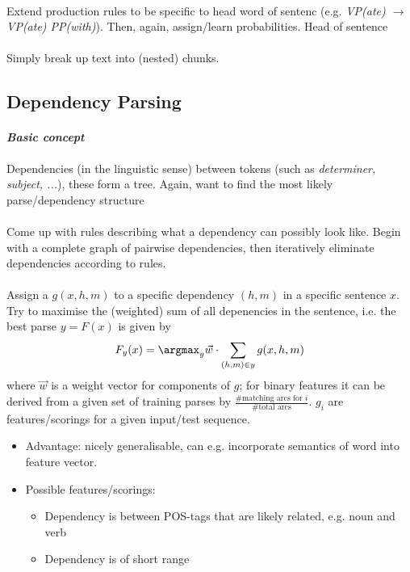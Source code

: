 \documentclass[10pt,twocolumn]{article}
\begin{document}
\paragraph{} Extend production rules to be specific to
head word of sentenc (e.g. \textit{VP(ate)  $\rightarrow$ VP(ate) PP(with)}). Then, again,
assign/learn probabilities. \todo Head of sentence

\paragraph{ } Simply break up text into (nested) chunks.

\subsection{Dependency Parsing}

\paragraph{\textit{Basic concept}} Dependencies (in the linguistic sense)
between tokens (such as \textit{determiner, subject, ...}), these form a tree.
Again, want to find the most likely parse/dependency structure

\paragraph{ } Come up with rules describing what a
dependency can possibly look like. Begin with a complete graph of pairwise
dependencies, then iteratively eliminate dependencies according to rules.

\paragraph{ } Assign a 
$g(x,h,m)$ to a specific dependency $(h,m)$ in a specific sentence $x$. Try to
maximise the (weighted) sum of all depenencies in the sentence, i.e. the best
parse $y = F(x)$ is given by
\begin{align*}
  F_y(x) = \argmax_y \vec w \cdot \sum_{(h,m)\in y} g(x,h,m)
\end{align*}
where $\vec w$ is a weight vector for components of $g$; for binary features it
can be derived from a given set of training parses by $\frac{\text{\# matching
    arcs for $i$} }{\text{\# total arcs} }$. $g_i$ are features/scorings for a
given input/test sequence.
\begin{itemize}
\item Advantage: nicely generalisable, can e.g. incorporate semantics of word
  into feature vector.
\item Possible features/scorings:
  \begin{itemize}
  \item Dependency is between POS-tags that are likely related, e.g. noun
    and verb
  \item Dependency is of short range
  \end{itemize}
\end{itemize}
\end{document}
